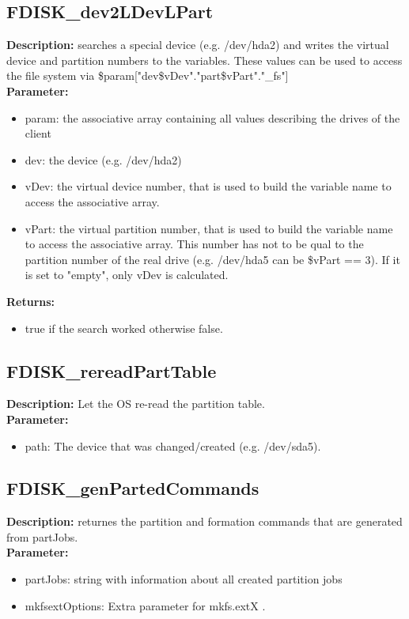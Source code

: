 \subsection{FDISK\_dev2LDevLPart}
\textbf{Description:} searches a special device (e.g. /dev/hda2) and writes the virtual device and partition numbers to the variables. These values can be used to access the file system via \$param["dev\$vDev"."part\$vPart"."\_fs"]\\
\textbf{Parameter:}
\begin{itemize}
\item param: the associative array containing all values describing the drives of the client
\item dev: the device (e.g. /dev/hda2)
\item vDev: the virtual device number, that is used to build the variable name to access the associative array.
\item vPart: the virtual partition number, that is used to build the variable name to access the associative array. This number has not to be qual to the partition number of the real drive (e.g. /dev/hda5 can be \$vPart == 3). If it is set to "empty", only vDev is calculated.
\end{itemize}
\textbf{Returns:}
\begin{itemize}
\item true if the search worked otherwise false.
\end{itemize}

\subsection{FDISK\_rereadPartTable}
\textbf{Description:} Let the OS re-read the partition table.\\
\textbf{Parameter:}
\begin{itemize}
\item path: The device that was changed/created (e.g. /dev/sda5).
\end{itemize}

\subsection{FDISK\_genPartedCommands}
\textbf{Description:} returnes the partition and formation commands that are generated from partJobs.\\
\textbf{Parameter:}
\begin{itemize}
\item partJobs: string with information about all created partition jobs
\item mkfsextOptions: Extra parameter for mkfs.extX .
\end{itemize}

